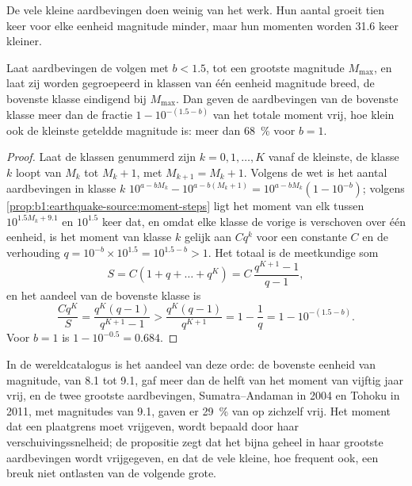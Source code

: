 De vele kleine aardbevingen doen weinig van het werk. Hun aantal groeit tien keer voor elke eenheid magnitude minder, maar hun momenten worden 31.6 keer kleiner.

\begin{proposition}\label{prop:b1:earthquake-source:largest}
Laat aardbevingen de  volgen met $b < 1.5$, tot een grootste magnitude $M_{\max}$, en laat zij worden gegroepeerd in klassen van één eenheid magnitude breed, de bovenste klasse eindigend bij $M_{\max}$. Dan geven de aardbevingen van de bovenste klasse meer dan de fractie $1 - 10^{-(1.5 - b)}$ van het totale moment vrij, hoe klein ook de kleinste geteldde magnitude is: meer dan \qty{68}{\percent} voor $b = 1$.
\end{proposition}

\begin{proof}
Laat de klassen genummerd zijn $k = 0, 1, \dots, K$ vanaf de kleinste, de klasse $k$ loopt van $M_k$ tot $M_k + 1$, met $M_{k+1} = M_k + 1$. Volgens de wet is het aantal aardbevingen in klasse $k$ $10^{a - bM_k} - 10^{a - b(M_k+1)} =
10^{a - bM_k}(1 - 10^{-b})$; volgens \cref{prop:b1:earthquake-source:moment-steps}
ligt het moment van elk tussen $10^{1.5M_k + 9.1}$ en $10^{1.5}$ keer dat, en omdat elke klasse de vorige is verschoven over één eenheid, is het moment van
klasse $k$ gelijk aan $C q^k$ voor een constante $C$ en de verhouding
$q = 10^{-b}\times10^{1.5} = 10^{1.5 - b} > 1$. Het totaal is de meetkundige som
\[
  S = C(1 + q + \dots + q^K) = C\,\frac{q^{K+1} - 1}{q - 1} ,
\]
en het aandeel van de bovenste klasse is
\[
  \frac{C q^K}{S} = \frac{q^K (q - 1)}{q^{K+1} - 1}
  > \frac{q^K (q - 1)}{q^{K+1}} = 1 - \frac1q = 1 - 10^{-(1.5 - b)} .
\]
Voor $b = 1$ is $1 - 10^{-0.5} = 0.684$.
\end{proof}

In de wereldcatalogus is het aandeel van deze orde: de bovenste eenheid van magnitude, van 8.1 tot 9.1, gaf meer dan de helft van het moment van vijftig jaar vrij, en de twee grootste aardbevingen, Sumatra--Andaman in 2004 en Tohoku in 2011, met magnitudes van 9.1, gaven er \qty{29}{\percent} van op zichzelf vrij. Het moment dat een plaatgrens moet vrijgeven, wordt bepaald door haar verschuivingssnelheid; de propositie zegt dat het bijna geheel in haar grootste aardbevingen wordt vrijgegeven, en dat de vele kleine, hoe frequent ook, een breuk niet ontlasten van de volgende grote.


